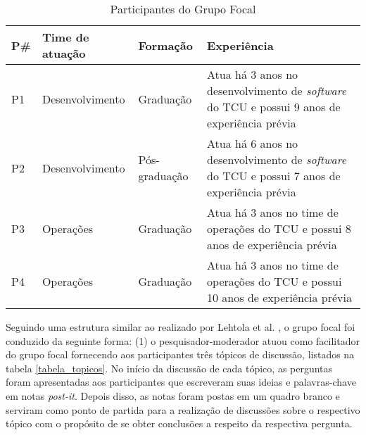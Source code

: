 \begin{table}[hb!]
\centering
\caption{Participantes do Grupo Focal}
\label{tabela_participantes_grupo_focal}
\begin{tabular}{|p{1cm}|p{4cm}|p{3cm}|p{7cm}|} \hline
{\bf P\#} & {\bf Time de atuação} & {\bf Formação} & {\bf Experiência}\\ \hline
P1 & Desenvolvimento & Graduação & Atua há 3 anos no desenvolvimento de {\it software} do \acrshort{TCU} e possui 9 anos de experiência prévia \\ \hline
P2 & Desenvolvimento & Pós-graduação & Atua há 6 anos no desenvolvimento de {\it software} do \acrshort{TCU} e possui 7 anos de experiência prévia \\ \hline
P3 & Operações & Graduação & Atua há 3 anos no time de operações do \acrshort{TCU} e possui 8 anos de experiência prévia \\ \hline
P4 & Operações & Graduação & Atua há 3 anos no time de operações do \acrshort{TCU} e possui 10 anos de experiência prévia \\ \hline
\end{tabular}
\end{table}

Seguindo uma estrutura similar ao realizado por Lehtola et al. \cite{requirementes_priorization_in_practice},
o grupo focal foi conduzido da seguinte forma: (1) o pesquisador-moderador atuou
como facilitador do grupo focal fornecendo aos participantes três tópicos de
discussão, listados na tabela \ref{tabela_topicos}. No início da discussão de
cada tópico, as perguntas foram apresentadas aos participantes que escreveram
suas ideias e palavras-chave em notas {\it post-it}. Depois disso, as notas
foram postas em um quadro branco e serviram como ponto de partida para a
realização de discussões sobre o respectivo tópico com o propósito de se obter
conclusões a respeito da respectiva pergunta.

